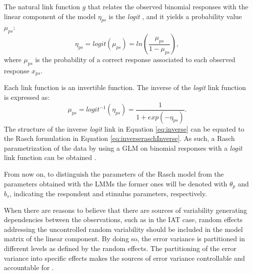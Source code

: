\documentclass[12pt]{book}
\begin{document}
The natural link function $g$ that relates the observed binomial responses with the linear component of the model $\eta_{ps}$ is the \emph{logit} \cite<the logarithm of the odds,>{mc1989}, and it yields a probability value $\mu_{ps}$:
\begin{equation}\label{eq:logit}
	\eta_{ps} = logit(\mu_{ps}) = ln\left( \frac{\mu_{ps}}{1 - \mu_{ps}}\right),
\end{equation}
where $\mu_{ps}$ is the probability of a correct response associated to each observed response $x_{ps}$.

Each link function is an invertible function. The inverse of the \emph{logit} link function is expressed as:
\begin{equation}\label{eq:inverse}
	\mu_{ps} = logit^{-1}(\eta_{ps}) = \frac{1}{1 + exp(-\eta_{ps})}.
\end{equation}
The structure of the inverse \emph{logit} link in Equation \ref{eq:inverse} can be equated to the Rasch formulation in Equation \ref{eq:inverseraschInverse}. 
As such, a Rasch parametrization of the data by using a GLM on binomial responses with a \emph{logit} link function can be obtained \cite{DeBoeck2011, Doran2007, Gelman2007}. 

From now on, to distinguish the parameters of the Rasch model from the parameters obtained with the LMMs the former ones will be denoted with $\theta_p$ and $b_s$, indicating the respondent  and stimulus parameters, respectively.


When there are reasons to believe that there  are sources of variability generating dependencies between the observations, such as in the IAT case, random effects addressing the uncontrolled  random variability should be included in the model matrix of the linear component. 
By doing so, the error variance is partitioned in different levels as defined by the random effects. 
The partitioning of the error variance into specific effects makes the sources of error variance controllable and accountable for \cite{Doran2007}.
\end{document}
